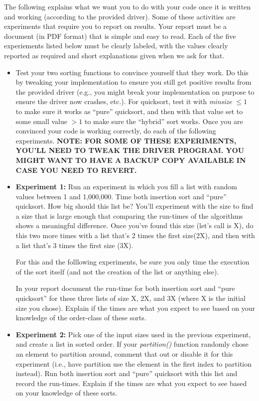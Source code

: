 \documentclass[11pt]{article}
\begin{document}
The following explains what we want you to do with your code once it is written and working (according to the provided driver). Some of these activities are experiments that require you to report on results. Your report must be a document (in PDF format) that is simple and easy to read. Each of the five experiements listed below must be clearly labeled, with the values clearly reported as required and short explanations given when we ask for that.
\begin{itemize}

\item Test your two sorting functions to convince yourself that they work. Do this by tweaking your implementation to ensure you still get positive results from the provided driver (e.g., you might break your implementation on purpose to ensure the driver now crashes, etc.). For quicksort, test it with {\em minsize} $\leq 1$ to make sure it works as ``pure'' quicksort, and then with that value set to some small value $>1$ to make sure the ``hybrid'' sort works. Once you are convinced your code is working correctly, do each of the following experiments. \textbf{NOTE: FOR SOME OF THESE EXPERIMENTS, YOU'LL NEED TO TWEAK THE DRIVER PROGRAM. YOU MIGHT WANT TO HAVE A BACKUP COPY AVAILABLE IN CASE YOU NEED TO REVERT.}

\item {\bf Experiment 1:} Run an experiment in which you fill a list with random values between 1 and 1,000,000. Time both insertion sort and ``pure'' quicksort.  How big should this list be?  You'll experiment with the size to find a size that is large enough that comparing the run-times of the algorithms shows a meaningful difference.  Once you've found this size (let's call is X), do this two more times with a list that's 2 times the first size(2X), and then with a list that's 3 times the first size (3X).

For this and the folllowing experiments, be sure you only time the execution of the sort itself (and not the creation of the list or anything else).

In your report document the run-time for both insertion sort and ``pure quicksort'' for these three lists of size X, 2X, and 3X (where X is the initial size you chose).  Explain if the times are what you expect to see based on your knowledge of the order-class of these sorts.

\item {\bf Experiment 2:} Pick one of the input sizes used in the previous experiment, and create a list in sorted order. If your {\em partition()\/} function randomly chose an element to partition around, comment that out or disable it for this experiment (i.e., have partition use the element in the first index to partition instead). Run both insertion sort and ``pure'' quicksort with this list and record the run-times. Explain if the times are what you expect to see based on your knowledge of these sorts.


\end{itemize}
\end{document}
